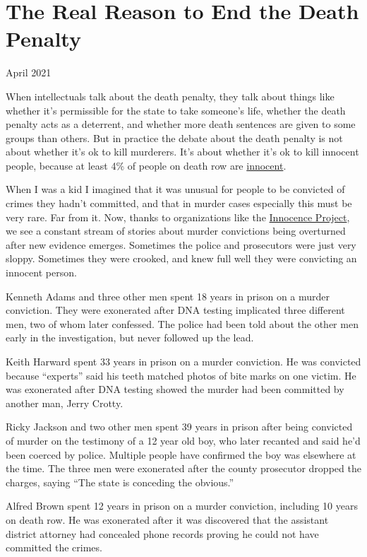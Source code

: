 \chapter{The Real Reason to End the Death Penalty}

April 2021

When intellectuals talk about the death penalty, they talk about things
like whether it's permissible for the state to take someone's life,
whether the death penalty acts as a deterrent, and whether more death
sentences are given to some groups than others. But in practice the
debate about the death penalty is not about whether it's ok to kill
murderers. It's about whether it's ok to kill innocent people, because
at least 4\% of people on death row are
\href{https://www.pnas.org/content/111/20/7230}{innocent}.

When I was a kid I imagined that it was unusual for people to be
convicted of crimes they hadn't committed, and that in murder cases
especially this must be very rare. Far from it. Now, thanks to
organizations like the
\href{https://innocenceproject.org/all-cases}{Innocence Project}, we see
a constant stream of stories about murder convictions being overturned
after new evidence emerges. Sometimes the police and prosecutors were
just very sloppy. Sometimes they were crooked, and knew full well they
were convicting an innocent person.

Kenneth Adams and three other men spent 18 years in prison on a murder
conviction. They were exonerated after DNA testing implicated three
different men, two of whom later confessed. The police had been told
about the other men early in the investigation, but never followed up
the lead.

Keith Harward spent 33 years in prison on a murder conviction. He was
convicted because ``experts'' said his teeth matched photos of bite
marks on one victim. He was exonerated after DNA testing showed the
murder had been committed by another man, Jerry Crotty.

Ricky Jackson and two other men spent 39 years in prison after being
convicted of murder on the testimony of a 12 year old boy, who later
recanted and said he'd been coerced by police. Multiple people have
confirmed the boy was elsewhere at the time. The three men were
exonerated after the county prosecutor dropped the charges, saying ``The
state is conceding the obvious.''

Alfred Brown spent 12 years in prison on a murder conviction, including
10 years on death row. He was exonerated after it was discovered that
the assistant district attorney had concealed phone records proving he
could not have committed the crimes.


